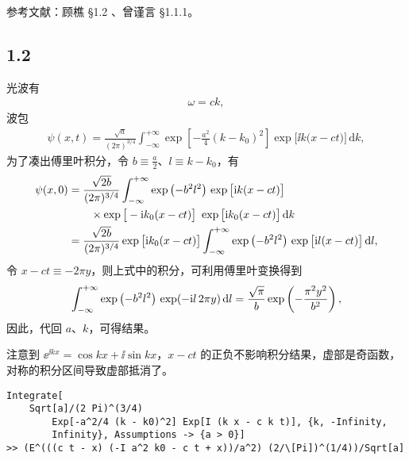 参考文献：顾樵 \S 1.2 、曾谨言 \S 1.1.1。
\subsection{1.2}

光波有
\begin{eqnarray}
    \omega = c k,
\end{eqnarray}
波包
\begin{align}
    \psi(x,t) = \frac{\sqrt a}{(2\pi)^{3/4}} \int_{- \infty}^{+ \infty} \exp\left[-\frac{a^2}4 (k-k_0)^2\right]\exp \big[ \ii k \big( x - c t \big) \big] \, \mathrm{d} k,
\end{align}
为了凑出傅里叶积分，令 $b \equiv \frac a2$、$l \equiv k-k_0$，有
\begin{align}
    \psi(x,0) & = \frac{\sqrt {2b}}{(2\pi)^{3/4}} \int_{- \infty}^{+ \infty} \exp\left(-b^2l^2\right) \, \exp \big[ \mathrm{i} k ( x - c t ) \big] \, \notag\\ &\quad\quad \times\exp\big[ -\mathrm{i} k_0 ( x - c t ) \big]\, \, \exp\big[ \mathrm{i} k_0 ( x - c t ) \big] \,\mathrm{d} k \\
    &=\frac{\sqrt {2b}}{(2\pi)^{3/4}} \exp\big[\mathrm{i} k_0 (x-ct)\big] \int_{- \infty}^{+ \infty} 
    \exp\left(-b^2l^2\right) \, \exp\big[\mathrm{i} l (x - c t)\big] \, \mathrm{d} l,
\end{align}
令 $x - ct \equiv - 2\pi y$，则上式中的积分，可利用傅里叶变换得到
\begin{align}
    \int_{- \infty}^{+ \infty} 
    \exp\left(-b^2l^2\right) \, \exp(-\mathrm{i} l \, 2 \pi y) \, \mathrm{d} l = \frac{\sqrt \pi}b \exp \left(-\frac{\pi^2y^2}{b^2}\right),
\end{align}
因此，代回 $a$、$k$，可得结果。

注意到 $\ee^{\ii kx} = \cos kx + \ii \sin kx$，$x-ct$ 的正负不影响积分结果，虚部是奇函数，对称的积分区间导致虚部抵消了。
\begin{lstlisting}
Integrate[
    Sqrt[a]/(2 Pi)^(3/4)
        Exp[-a^2/4 (k - k0)^2] Exp[I (k x - c k t)], {k, -Infinity, 
        Infinity}, Assumptions -> {a > 0}]
>> (E^(((c t - x) (-I a^2 k0 - c t + x))/a^2) (2/\[Pi])^(1/4))/Sqrt[a]
\end{lstlisting}

